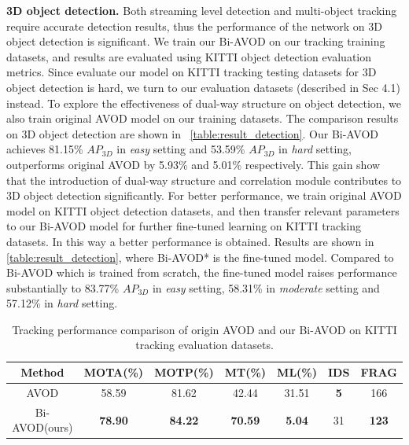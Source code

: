 \documentclass{bmvc2k}
\begin{document}
\textbf{3D object detection.} Both streaming level detection and multi-object tracking require accurate detection results, thus the performance of the network on 3D object detection is significant. We train our Bi-AVOD on our tracking training datasets, and results are evaluated using KITTI object detection evaluation metrics. Since evaluate our model on KITTI tracking testing datasets for 3D object detection is hard, we turn to our evaluation datasets (described in Sec 4.1) instead. To explore the effectiveness of dual-way structure on object detection, we also train original AVOD model on our training datasets. The comparison results on 3D object detection are shown in \tablename \, \ref{table:result_detection}. Our Bi-AVOD achieves 81.15\% $AP_{3D}$ in \textit{easy} setting and 53.59\% $AP_{3D}$ in \textit{hard} setting, outperforms original AVOD by 5.93\% and 5.01\% respectively. This gain show that the introduction of dual-way structure and correlation module contributes to 3D object detection significantly. For better performance, we train original AVOD model on KITTI object detection datasets, and then transfer relevant parameters to our Bi-AVOD model for further fine-tuned learning on KITTI tracking datasets. In this way a better performance is obtained. Results are shown in \tablename \, \ref{table:result_detection}, where Bi-AVOD* is the fine-tuned model. Compared to Bi-AVOD which is trained from scratch, the fine-tuned model raises performance substantially to 83.77\% $AP_{3D}$ in \textit{easy} setting, 58.31\% in \textit{moderate} setting and 57.12\% in \textit{hard} setting.

\begin{table}\centering
	\footnotesize
	\begin{tabular}{ccccccc}
		\toprule[1.5pt]
		Method        & MOTA(\%) & MOTP(\%) & MT(\%) & ML(\%) & IDS & FRAG \\ \midrule
		AVOD\cite{ku2018joint}          & 58.59    & 81.62    & 42.44  & 31.51  & \textbf{5}   & 166  \\
		Bi-AVOD(ours) & \textbf{78.90}    & \textbf{84.22}    & \textbf{70.59}  & \textbf{5.04}  & 31  &  \textbf{123}  \\ 
		\bottomrule[1.5pt]
	\end{tabular}
	\setlength{\abovecaptionskip}{1pt}
	\caption{Tracking performance comparison of origin AVOD and our Bi-AVOD on KITTI tracking evaluation datasets.}
	\label{label:result_tracking}
\end{table}
\end{document}
